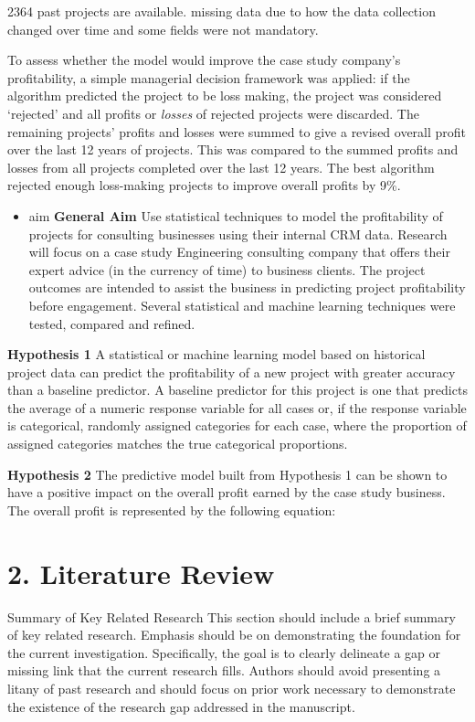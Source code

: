 \documentclass[]{elsarticle} %
\providecommand{\tightlist}{%
  \setlength{\itemsep}{0pt}\setlength{\parskip}{0pt}}
\begin{document}
2364 past projects are available. missing data due to how the data
collection changed over time and some fields were not mandatory.

To assess whether the model would improve the case study company's
profitability, a simple managerial decision framework was applied: if
the algorithm predicted the project to be loss making, the project was
considered `rejected' and all profits or \emph{losses} of rejected
projects were discarded. The remaining projects' profits and losses were
summed to give a revised overall profit over the last 12 years of
projects. This was compared to the summed profits and losses from all
projects completed over the last 12 years. The best algorithm rejected
enough loss-making projects to improve overall profits by 9\%.

\begin{itemize}
\tightlist
\item
  aim \textbf{General Aim} Use statistical techniques to model the
  profitability of projects for consulting businesses using their
  internal CRM data. Research will focus on a case study Engineering
  consulting company that offers their expert advice (in the currency of
  time) to business clients. The project outcomes are intended to assist
  the business in predicting project profitability before engagement.
  Several statistical and machine learning techniques were tested,
  compared and refined.
\end{itemize}

\textbf{Hypothesis 1} A statistical or machine learning model based on
historical project data can predict the profitability of a new project
with greater accuracy than a baseline predictor. A baseline predictor
for this project is one that predicts the average of a numeric response
variable for all cases or, if the response variable is categorical,
randomly assigned categories for each case, where the proportion of
assigned categories matches the true categorical proportions.

\textbf{Hypothesis 2} The predictive model built from Hypothesis 1 can
be shown to have a positive impact on the overall profit earned by the
case study business. The overall profit is represented by the following
equation:

\section{2. Literature Review}\label{literature-review}

Summary of Key Related Research This section should include a brief
summary of key related research. Emphasis should be on demonstrating the
foundation for the current investigation. Specifically, the goal is to
clearly delineate a gap or missing link that the current research fills.
Authors should avoid presenting a litany of past research and should
focus on prior work necessary to demonstrate the existence of the
research gap addressed in the manuscript.
\end{document}
